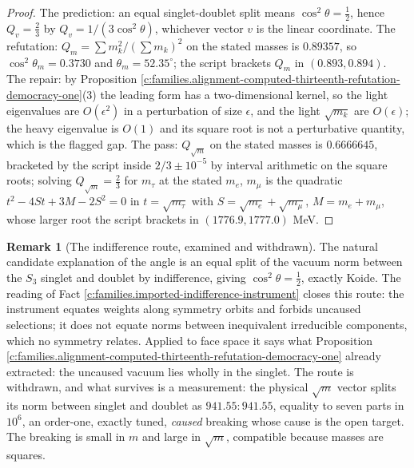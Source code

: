 \documentclass[11pt]{article}
\theoremstyle{definition}
\newtheorem{remark}[theorem]{Remark}
\theoremstyle{plain}
\begin{document}
\begin{proof}
The prediction: an equal singlet-doublet split means $\cos^{2}\theta = \tfrac12$, hence $Q_{v} = \tfrac23$ by $Q_{v} = 1/(3\cos^{2}\theta)$, whichever vector $v$ is the linear coordinate. The refutation: $Q_{m} = \sum m_{k}^{2}/(\sum m_{k})^{2}$ on the stated masses is $0.89357$, so $\cos^{2}\theta_{m} = 0.3730$ and $\theta_{m} = 52.35^{\circ}$; the script brackets $Q_{m}$ in $(0.893, 0.894)$. The repair: by Proposition \ref{c:families.alignment-computed-thirteenth-refutation-democracy-one}(3) the leading form has a two-dimensional kernel, so the light eigenvalues are $O(\epsilon^{2})$ in a perturbation of size $\epsilon$, and the light $\sqrt{m_{k}}$ are $O(\epsilon)$; the heavy eigenvalue is $O(1)$ and its square root is not a perturbative quantity, which is the flagged gap. The pass: $Q_{\sqrt{m}}$ on the stated masses is $0.6666645$, bracketed by the script inside $2/3 \pm 10^{-5}$ by interval arithmetic on the square roots; solving $Q_{\sqrt{m}} = \tfrac23$ for $m_{\tau}$ at the stated $m_{e}$, $m_{\mu}$ is the quadratic $t^{2} - 4St + 3M - 2S^{2} = 0$ in $t = \sqrt{m_{\tau}}$ with $S = \sqrt{m_{e}} + \sqrt{m_{\mu}}$, $M = m_{e} + m_{\mu}$, whose larger root the script brackets in $(1776.9, 1777.0)$ MeV.

\end{proof}

\begin{remark}[The indifference route, examined and withdrawn]\label{c:note.families.indifference-route-examined-withdrawn}
The natural candidate explanation of the angle is an equal split of the vacuum norm between the $S_{3}$ singlet and doublet by indifference, giving $\cos^{2}\theta = \tfrac12$, exactly Koide. The reading of Fact \ref{c:families.imported-indifference-instrument} closes this route: the instrument equates weights along symmetry orbits and forbids uncaused selections; it does not equate norms between inequivalent irreducible components, which no symmetry relates. Applied to face space it says what Proposition \ref{c:families.alignment-computed-thirteenth-refutation-democracy-one} already extracted: the uncaused vacuum lies wholly in the singlet. The route is withdrawn, and what survives is a measurement: the physical $\sqrt{m}$ vector splits its norm between singlet and doublet as $941.55 : 941.55$, equality to seven parts in $10^{6}$, an order-one, exactly tuned, \emph{caused} breaking whose cause is the open target. The breaking is small in $m$ and large in $\sqrt{m}$, compatible because masses are squares.
\end{remark}
\end{document}
